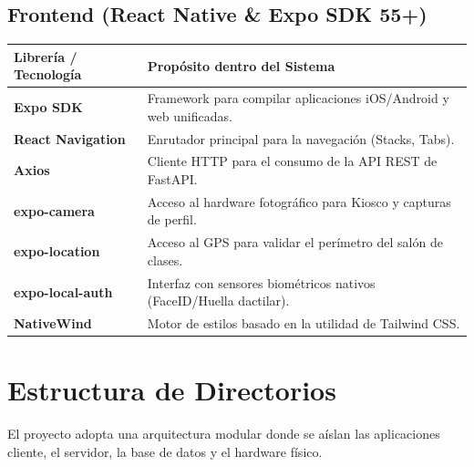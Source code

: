 \documentclass[12pt,a4paper]{article}
\begin{document}
\subsection{Frontend (React Native \& Expo SDK 55+)}
\begin{table}[h]
    \centering
    \begin{tabularx}{\textwidth}{|l|X|}
        \hline
        \textbf{Librería / Tecnología} & \textbf{Propósito dentro del Sistema} \\
        \hline
        \textbf{Expo SDK} & Framework para compilar aplicaciones iOS/Android y web unificadas. \\
        \hline
        \textbf{React Navigation} & Enrutador principal para la navegación (Stacks, Tabs). \\
        \hline
        \textbf{Axios} & Cliente HTTP para el consumo de la API REST de FastAPI. \\
        \hline
        \textbf{expo-camera} & Acceso al hardware fotográfico para Kiosco y capturas de perfil. \\
        \hline
        \textbf{expo-location} & Acceso al GPS para validar el perímetro del salón de clases. \\
        \hline
        \textbf{expo-local-auth} & Interfaz con sensores biométricos nativos (FaceID/Huella dactilar). \\
        \hline
        \textbf{NativeWind} & Motor de estilos basado en la utilidad de Tailwind CSS. \\
        \hline
    \end{tabularx}
\end{table}

\section{Estructura de Directorios}
El proyecto adopta una arquitectura modular donde se aíslan las aplicaciones cliente, el servidor, la base de datos y el hardware físico.
\end{document}
